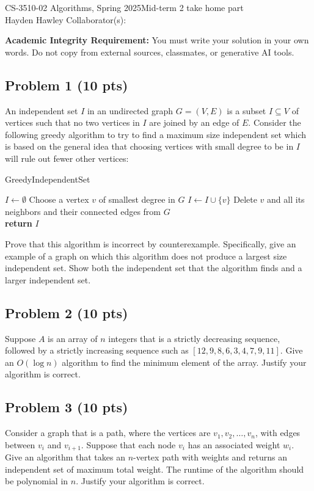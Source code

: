 \documentclass[12pt]{article}
\begin{document}
\noindent CS-3510-02 Algorithms, Spring 2025\hfill Mid-term 2 take home part\\
Hayden Hawley \hfill Collaborator(s):

\hrulefill

\textbf{Academic Integrity Requirement:} You must write your solution in your own words. Do not copy from external sources, classmates, or generative AI tools.

\subsection*{Problem 1 (10 pts)}

An independent set $I$ in an undirected graph $G = (V, E)$ is a subset $I \subseteq V$ of vertices such that no two vertices in $I$ are joined by an edge of $E$. Consider the following greedy algorithm to try to find a maximum size independent set which is based on the general idea that choosing vertices with small degree to be in $I$ will rule out fewer other vertices:

\begin{algorithm}
\caption{GreedyIndependentSet}
\begin{algorithmic}[1]
\State $I \gets \emptyset$
    \State Choose a vertex $v$ of smallest degree in $G$ 
    \State $I \gets I \cup \{v\}$
    \State Delete $v$ and all its neighbors and their connected edges from $G$\\
\EndWhile
\State \textbf{return} $I$
\end{algorithmic}
\end{algorithm}

Prove that this algorithm is incorrect by counterexample. Specifically, give an example of a graph on which this algorithm does not produce a largest size independent set. Show both the independent set that the algorithm finds and a larger independent set.

\subsection*{Problem 2 (10 pts)}
Suppose $A$ is an array of $n$ integers that is a strictly decreasing sequence, followed by a strictly increasing sequence such as $[12, 9, 8, 6, 3, 4, 7, 9, 11]$. Give an $O(\log n)$ algorithm to find the minimum element of the array. Justify your algorithm is correct.

\subsection*{Problem 3 (10 pts)}
Consider a graph that is a path, where the vertices are $v_1, v_2, \ldots, v_n$, with edges between $v_i$ and $v_{i+1}$. Suppose that each node $v_i$ has an associated weight $w_i$. Give an algorithm that takes an $n$-vertex path with weights and returns an independent set of maximum total weight. The runtime of the algorithm should be polynomial in $n$. Justify your algorithm is correct.
\end{document}
